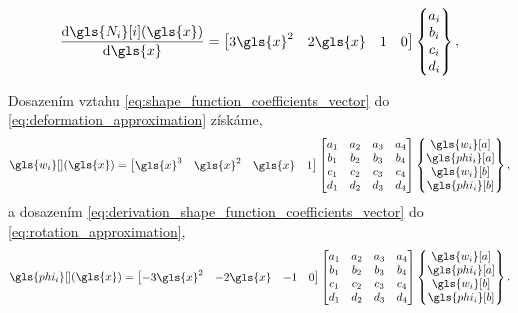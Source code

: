 \begin{equation}
    \label{eq:derivation_shape_function_coefficients_vector}
    \dv{\gls{N_i}[i](\gls{x})}{\gls{x}} = 
    \begin{bmatrix}
        3\gls{x}^2 &
        2\gls{x} &
        1 &
        0
    \end{bmatrix}
    \begin{Bmatrix}
        a_i \\
        b_i \\
        c_i \\
        d_i \\
    \end{Bmatrix},
\end{equation}

Dosazením vztahu \ref{eq:shape_function_coefficients_vector} do \ref{eq:deformation_approximation} získáme,
\begin{equation}
    \label{eq:w_midstep}
    \gls{w_i}[ ] (\gls{x}) = 
    \begin{bmatrix}
        \gls{x}^3 &
        \gls{x}^2 &
        \gls{x} &
        1
    \end{bmatrix}
    \begin{bmatrix}
        a_1 & a_2 & a_3 & a_4 \\
        b_1 & b_2 & b_3 & b_4 \\
        c_1 & c_2 & c_3 & c_4 \\
        d_1 & d_2 & d_3 & d_4 \\
    \end{bmatrix}
    \begin{Bmatrix}
        \gls{w_i}[a] \\
        \gls{phi_i}[a] \\
        \gls{w_i}[b] \\
        \gls{phi_i}[b] \\
    \end{Bmatrix},
\end{equation}
a dosazením \ref{eq:derivation_shape_function_coefficients_vector} do \ref{eq:rotation_approximation},
\begin{equation}
    \label{eq:phi_midstep}
    \gls{phi_i}[ ] (\gls{x}) = 
    \begin{bmatrix}
        - 3\gls{x}^2 &
        - 2\gls{x} &
        - 1 &
        0
    \end{bmatrix}
    \begin{bmatrix}
        a_1 & a_2 & a_3 & a_4 \\
        b_1 & b_2 & b_3 & b_4 \\
        c_1 & c_2 & c_3 & c_4 \\
        d_1 & d_2 & d_3 & d_4 \\
    \end{bmatrix}
    \begin{Bmatrix}
        \gls{w_i}[a] \\
        \gls{phi_i}[a] \\
        \gls{w_i}[b] \\
        \gls{phi_i}[b] \\
    \end{Bmatrix}.
\end{equation}
